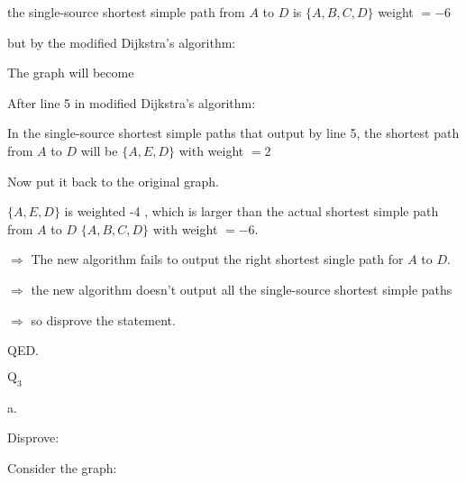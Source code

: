 \documentclass[12pt]{article}
\begin{document}
the single-source shortest simple path from $A$ to $D$ is $\{A ,  B ,  C ,  D\}$ weight $=-6$

but by the modified Dijkstra's algorithm:

The graph will become
\begin{center}
\end{center}
    
After line 5 in modified Dijkstra's algorithm:

In the single-source shortest simple paths that output by line 5,
the shortest path from $A$ to $D$ will be $\{A, E, D\}$ with weight $=2$ 

Now put it back to the original graph.

$\{A, E, D\}$ is weighted -4 , which is larger than the actual shortest simple path from $A$ to $D$ $\{A, B, C, D\}$ with weight $=-6$.

$\Rightarrow$ The new algorithm fails to output the right shortest single path for $A$ to $D$.

$\Rightarrow$ the new algorithm doesn't output all the single-source shortest simple paths

$\Rightarrow$ so disprove the statement.

QED.

\newpage
$\text{Q}_{3}$

a.

Disprove:

Consider the graph:
\begin{center}
\end{center}
\end{document}
